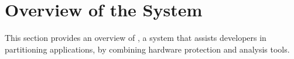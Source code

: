 \section{Overview of the \sysname{} System}
\label{sec:overview}

This section provides an overview of \sysname{},
a system that assists developers in partitioning \java{} applications,
by combining \sgx{} hardware protection and \java{} analysis tools.

\begin{comment}


There are multiple approaches to access \sgx{} hardware from \java{} applications as illustrated in Figure~\ref{fig:alternatives}. Firstly, the whole \java{} application can run with the \jvm{} inside the enclaves,
using a \sgx{} like Haven~\cite{baumann14haven}({\em libOS-based}).
Secondly, the untrusted components of \java{} application
can run with the \jvm{} outside the enclaves, and a JNI wrapper can communicate
with the trusted component written in native language running inside the enclave like ~\cite{vc3}({\em JNI-based}). 
However,the JNI-based approach requires developers to have the knowledge of
enclave implementation, and loses the language protection of \java{} inside the enclaves.
A more plausible approach is to provide enclave-backed APIs
from the \jvm{},
to support common use cases ({\em \jvm{}-based})), such as a secure key-value store~\cite{vc3}.
Although the \jvm{}-based approach can save the application developers' effort
of implementing isolated components,
the use cases is limited to the pre-defined operations provided by the \jvm{} or the companion frameworks.
Because the backend implementation (isolated components and untrusted interfaces) in the \jvm{}-based approach is the same as the JNI-based approach,
the same language restriction also applies here. 

\end{comment}

